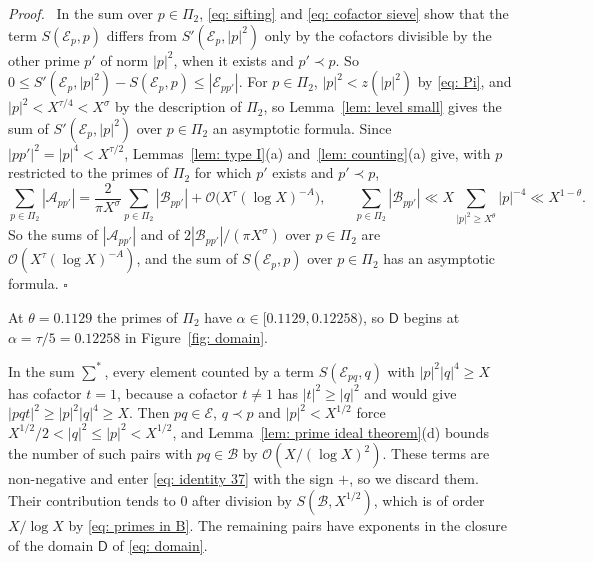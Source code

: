 \documentclass{article}
\numberwithin{equation}{section}
\newenvironment{proof}[1][Proof]{\par\medskip\noindent\textit{#1.}\ }{\hfill$\square$\par\medskip}
\newcommand{\Le}{\leqslant}
\newcommand{\Ge}{\geqslant}
\begin{document}
\begin{proof}
In the sum over $p \in \Pi_2$, \eqref{eq: sifting} and \eqref{eq: cofactor sieve} show that the term $S(\mathcal{E}_p, p)$ differs from $S'(\mathcal{E}_p, |p|^2)$ only by the cofactors divisible by the other prime $p'$ of norm $|p|^2$, when it exists and $p' \prec p$. So $0 \Le S'(\mathcal{E}_p, |p|^2) - S(\mathcal{E}_p, p) \Le |\mathcal{E}_{pp'}|$. For $p \in \Pi_2$, $|p|^2 < z(|p|^2)$ by \eqref{eq: Pi}, and $|p|^2 < X^{\tau/4} < X^{\sigma}$ by the description of $\Pi_2$, so Lemma~\ref{lem: level small} gives the sum of $S'(\mathcal{E}_p, |p|^2)$ over $p \in \Pi_2$ an asymptotic formula. Since $|pp'|^2 = |p|^4 < X^{\tau/2}$, Lemmas~\ref{lem: type I}(a) and~\ref{lem: counting}(a) give, with $p$ restricted to the primes of $\Pi_2$ for which $p'$ exists and $p' \prec p$,
\begin{equation*}
\sum_{p \in \Pi_2} |\mathcal{A}_{pp'}| = \frac{2}{\pi X^{\sigma}} \sum_{p \in \Pi_2} |\mathcal{B}_{pp'}| + \mathcal{O}\bigl(X^{\tau}(\log X)^{-A}\bigr), \qquad \sum_{p \in \Pi_2} |\mathcal{B}_{pp'}| \ll X \sum_{|p|^2 \Ge X^{\theta}} |p|^{-4} \ll X^{1 - \theta}.
\end{equation*}
So the sums of $|\mathcal{A}_{pp'}|$ and of $2|\mathcal{B}_{pp'}|/(\pi X^{\sigma})$ over $p \in \Pi_2$ are $\mathcal{O}(X^{\tau}(\log X)^{-A})$, and the sum of $S(\mathcal{E}_p, p)$ over $p \in \Pi_2$ has an asymptotic formula.
\end{proof}

At $\theta = 0.1129$ the primes of $\Pi_2$ have $\alpha \in [0.1129, 0.12258)$, so $\mathsf{D}$ begins at $\alpha = \tau/5 = 0.12258$ in Figure~\ref{fig: domain}.

In the sum $\sum^*$, every element counted by a term $S(\mathcal{E}_{pq}, q)$ with $|p|^2 |q|^4 \Ge X$ has cofactor $t = 1$, because a cofactor $t \neq 1$ has $|t|^2 \Ge |q|^2$ and would give $|pqt|^2 \Ge |p|^2 |q|^4 \Ge X$. Then $pq \in \mathcal{E}$, $q \prec p$ and $|p|^2 < X^{1/2}$ force $X^{1/2}/2 < |q|^2 \Le |p|^2 < X^{1/2}$, and Lemma~\ref{lem: prime ideal theorem}(d) bounds the number of such pairs with $pq \in \mathcal{B}$ by $\mathcal{O}(X/(\log X)^2)$. These terms are non-negative and enter \eqref{eq: identity 37} with the sign $+$, so we discard them. Their contribution tends to $0$ after division by $S(\mathcal{B}, X^{1/2})$, which is of order $X/\log X$ by \eqref{eq: primes in B}. The remaining pairs have exponents in the closure of the domain $\mathsf{D}$ of \eqref{eq: domain}.
\end{document}

